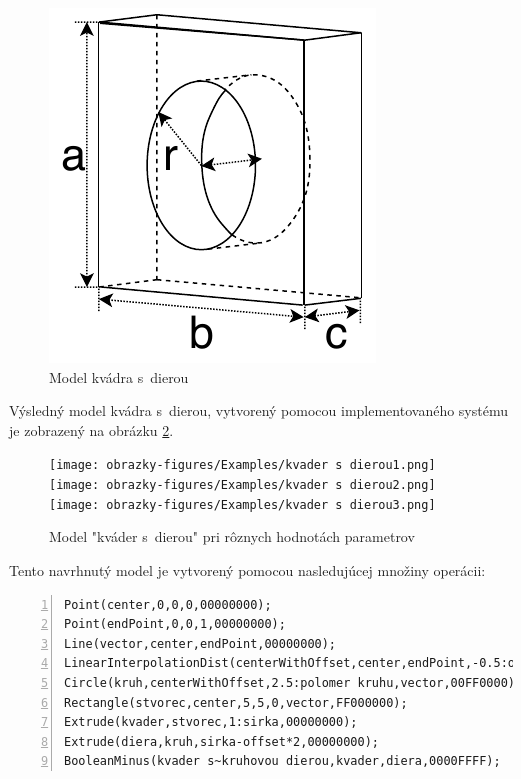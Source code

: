 \begin{figure}[H]
	\centering
	\includegraphics[height=0.3\textwidth]{obrazky-figures/Examples/A4x.pdf}
	\caption{Model kvádra s~dierou}
	\label{fig:A4vyhodnotenie}
\end{figure}

Výsledný model kvádra s~dierou, vytvorený pomocou implementovaného systému je zobrazený na obrázku \ref{fig:qwerty7io}.

\begin{figure}[H]
	\centering
	\texttt{[image: obrazky-figures/Examples/kvader s~dierou1.png]}
	\texttt{[image: obrazky-figures/Examples/kvader s~dierou2.png]}
	\texttt{[image: obrazky-figures/Examples/kvader s~dierou3.png]}
	\caption{Model "kváder s~dierou" pri rôznych hodnotách parametrov}
	\label{fig:qwerty7io}
\end{figure}

Tento navrhnutý model je vytvorený pomocou nasledujúcej množiny operácii:\nopagebreak

\vspace{10px}
\begin{minipage}{\linewidth}
\begin{lstlisting}[frame = {tb},numbers={left}]
Point(center,0,0,0,00000000);
Point(endPoint,0,0,1,00000000);
Line(vector,center,endPoint,00000000);
LinearInterpolationDist(centerWithOffset,center,endPoint,-0.5:offset,00000000);
Circle(kruh,centerWithOffset,2.5:polomer kruhu,vector,00FF0000);
Rectangle(stvorec,center,5,5,0,vector,FF000000);
Extrude(kvader,stvorec,1:sirka,00000000);
Extrude(diera,kruh,sirka-offset*2,00000000);
BooleanMinus(kvader s~kruhovou dierou,kvader,diera,0000FFFF);
\end{lstlisting}
\end{minipage}

